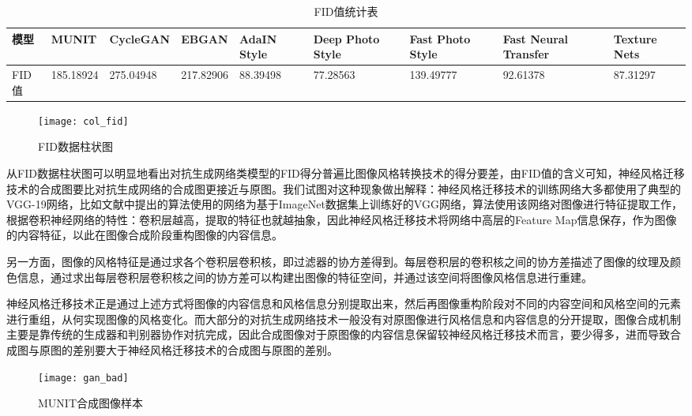 \begin{table}[h] 
    \centering
    \scriptsize
    \caption{FID值统计表}
    \begin{tabular}{l*{4}{p{2.5cm}}}
        \toprule
        模型 & MUNIT & CycleGAN & EBGAN & AdaIN Style & Deep Photo Style & Fast Photo Style & Fast Neural Transfer & Texture Nets \\
        \midrule
        FID值 & 185.18924 & 275.04948 & 217.82906 & 88.39498 & 77.28563 & 139.49777 & 92.61378 & 87.31297  \\
        \bottomrule
    \end{tabular}
    \label{table:fid}
\end{table}

\begin{figure}[h]
    \centering
    \texttt{[image: col\_fid]}
    \caption{FID数据柱状图}
    \label{col_fid}
\end{figure}

从FID数据柱状图可以明显地看出对抗生成网络类模型的FID得分普遍比图像风格转换技术的得分要差，由FID值的含义可知，神经风格迁移技术的合成图要比对抗生成网络的合成图更接近与原图。我们试图对这种现象做出解释：神经风格迁移技术的训练网络大多都使用了典型的VGG-19网络，比如文献\cite{nst}中提出的算法使用的网络为基于ImageNet数据集\cite{ImageNet}上训练好的VGG网络，算法使用该网络对图像进行特征提取工作，根据卷积神经网络的特性：卷积层越高，提取的特征也就越抽象，因此神经风格迁移技术将网络中高层的Feature Map信息保存，作为图像的内容特征，以此在图像合成阶段重构图像的内容信息。

另一方面，图像的风格特征是通过求各个卷积层卷积核，即过滤器的协方差得到。每层卷积层的卷积核之间的协方差描述了图像的纹理及颜色信息，通过求出每层卷积层卷积核之间的协方差可以构建出图像的特征空间，并通过该空间将图像风格信息进行重建。

神经风格迁移技术正是通过上述方式将图像的内容信息和风格信息分别提取出来，然后再图像重构阶段对不同的内容空间和风格空间的元素进行重组，从何实现图像的风格变化。而大部分的对抗生成网络技术一般没有对原图像进行风格信息和内容信息的分开提取，图像合成机制主要是靠传统的生成器和判别器协作对抗完成，因此合成图像对于原图像的内容信息保留较神经风格迁移技术而言，要少得多，进而导致合成图与原图的差别要大于神经风格迁移技术的合成图与原图的差别。

\begin{figure}[h]
    \centering
    \texttt{[image: gan\_bad]}
    \caption{MUNIT合成图像样本}
    \label{fig:gan}
\end{figure}

